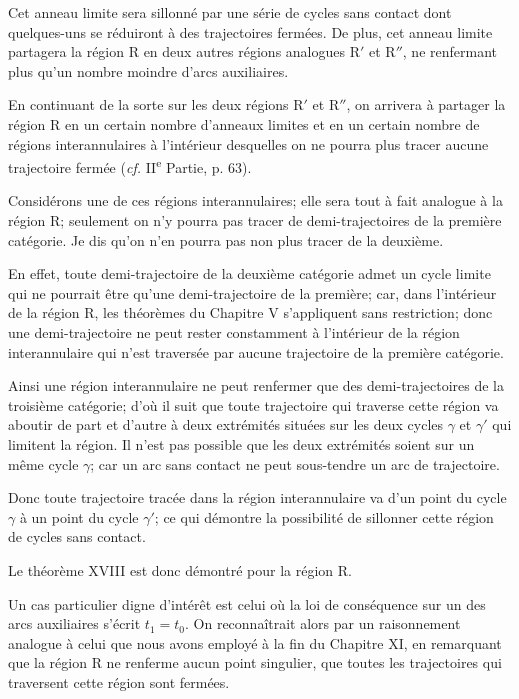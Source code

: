 \documentclass[11pt]{article}
\begin{document}
Cet anneau limite sera sillonné par une série de cycles sans contact dont quelques-uns se réduiront à des trajectoires fermées. De plus, cet anneau limite partagera la région R en deux autres régions analogues R$'$ et R$''$, ne renfermant plus qu’un nombre moindre d’arcs auxiliaires.

En continuant de la sorte sur les deux régions R$'$ et R$''$, on arrivera à partager la région R en un certain nombre d’anneaux limites et en un certain nombre de régions interannulaires à l’intérieur desquelles on ne pourra plus tracer aucune trajectoire fermée (\emph{cf.} II\textsuperscript{e} Partie, p. 63).

Considérons une de ces régions interannulaires; elle sera tout à fait analogue à la région R; seulement on n’y pourra pas tracer de demi-trajectoires de la première catégorie. Je dis qu’on n’en pourra pas non plus tracer de la deuxième.

En effet, toute demi-trajectoire de la deuxième catégorie admet un cycle limite qui ne pourrait être qu’une demi-trajectoire de la première; car, dans l’intérieur de la région R, les théorèmes du Chapitre V s’appliquent sans restriction; donc une demi-trajectoire ne peut rester constamment à l’intérieur de la région interannulaire qui n’est traversée par aucune trajectoire de la première catégorie.

Ainsi une région interannulaire ne peut renfermer que des demi-trajectoires de la troisième catégorie; d’où il suit que toute trajectoire qui traverse cette région va aboutir de part et d’autre à deux extrémités situées sur les deux cycles $\gamma$ et $\gamma'$ qui limitent la région. Il n’est pas possible que les deux extrémités soient sur un même cycle $\gamma$; car un arc sans contact ne peut sous-tendre un arc de trajectoire.

Donc toute trajectoire tracée dans la région interannulaire va d’un point du cycle $\gamma$ à un point du cycle $\gamma'$; ce qui démontre la possibilité de sillonner cette région de cycles sans contact.

Le théorème XVIII est donc démontré pour la région R.

Un cas particulier digne d’intérêt est celui où la loi de conséquence sur un des arcs auxiliaires s’écrit $t_1=t_0$. On reconnaîtrait alors par un raisonnement analogue à celui que nous avons employé à la fin du Chapitre XI, en remarquant que la région R ne renferme aucun point singulier, que toutes les trajectoires qui traversent cette région sont fermées.
\end{document}
